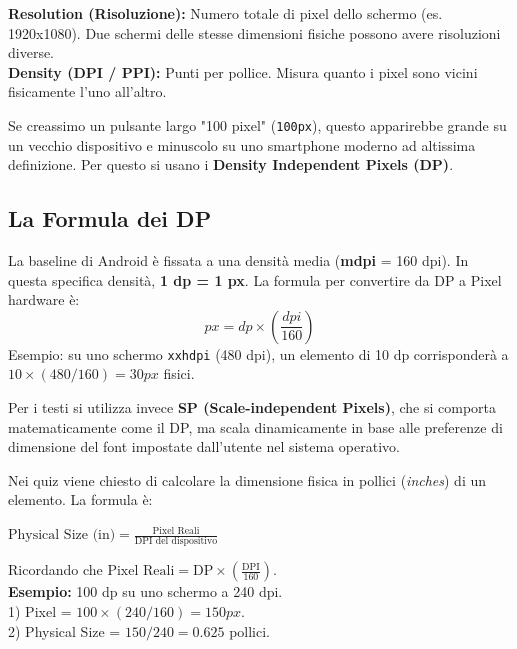 \begin{tcolorbox}[colback=green!5!white,colframe=green!50!black,title=Definizioni Chiave per i Quiz]
    \textbf{Resolution (Risoluzione):} Numero totale di pixel dello schermo (es.
    1920x1080).
    Due schermi delle stesse dimensioni fisiche possono avere risoluzioni diverse.\\
    \textbf{Density (DPI / PPI):} Punti per pollice.
    Misura quanto i pixel sono vicini fisicamente l'uno all'altro.
\end{tcolorbox}

Se creassimo un pulsante largo "100 pixel" (\texttt{100px}), questo apparirebbe grande su un vecchio dispositivo e minuscolo su uno smartphone moderno ad altissima definizione.
Per questo si usano i \textbf{Density Independent Pixels (DP)}.

\subsection{La Formula dei DP}
La baseline di Android è fissata a una densità media (\textbf{mdpi} = 160 dpi).
In questa specifica densità, \textbf{1 dp = 1 px}.
La formula per convertire da DP a Pixel hardware è:
\begin{equation}
    px = dp \times \left( \frac{dpi}{160} \right)
\end{equation}
Esempio: su uno schermo \texttt{xxhdpi} (480 dpi), un elemento di 10 dp corrisponderà a $10 \times (480/160) = 30px$ fisici.

Per i testi si utilizza invece \textbf{SP (Scale-independent Pixels)}, che si comporta matematicamente come il DP, ma
scala dinamicamente in base alle preferenze di dimensione del font impostate dall'utente nel sistema operativo.

\begin{tcolorbox}[colback=white,colframe=black,title=Calcolo della dimensione fisica (Quiz)]
    Nei quiz viene chiesto di calcolare la dimensione fisica in pollici (\textit{inches}) di un elemento. La formula è:
    \begin{center}
        $\text{Physical Size (in)} = \frac{\text{Pixel Reali}}{\text{DPI del dispositivo}}$
    \end{center}
    Ricordando che $\text{Pixel Reali} = \text{DP} \times (\frac{\text{DPI}}{160})$.\\
    \textbf{Esempio:} 100 dp su uno schermo a 240 dpi. \\
    1) Pixel = $100 \times (240/160) = 150px$. \\
    2) Physical Size = $150 / 240 = 0.625$ pollici.
\end{tcolorbox}

